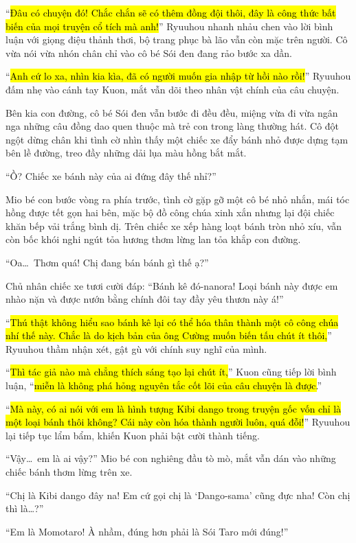 \documentclass[../main.tex]{subfiles}
\begin{document}
``\hl{Đâu có chuyện đó! Chắc chắn sẽ có thêm đồng đội thôi, đây là công thức bất biến của mọi truyện cổ tích mà anh!}'' Ryuuhou nhanh nhảu chen vào lời bình luận với giọng điệu thảnh thơi, bộ trang phục bà lão vẫn còn mặc trên người. Cô vừa nói vừa nhón chân chỉ vào cô bé Sói đen đang rảo bước xa dần.

``\hl{Anh cứ lo xa, nhìn kia kìa, đã có người muốn gia nhập từ hồi nào rồi!}'' Ryuuhou đấm nhẹ vào cánh tay Kuon, mắt vẫn dõi theo nhân vật chính của câu chuyện.

Bên kia con đường, cô bé Sói đen vẫn bước đi đều đều, miệng vừa đi vừa ngân nga những câu đồng dao quen thuộc mà trẻ con trong làng thường hát. Cô đột ngột dừng chân khi tình cờ nhìn thấy một chiếc xe đẩy bánh nhỏ được dựng tạm bên lề đường, treo đầy những dải lụa màu hồng bắt mắt.

``Ồ? Chiếc xe bánh này của ai đứng đây thế nhỉ?''

Mio bé con bước vòng ra phía trước, tình cờ gặp gỡ một cô bé nhỏ nhắn, mái tóc hồng được tết gọn hai bên, mặc bộ đồ công chúa xinh xắn nhưng lại đội chiếc khăn bếp vải trắng bình dị. Trên chiếc xe xếp hàng loạt bánh tròn nhỏ xíu, vẫn còn bốc khói nghi ngút tỏa hương thơm lừng lan tỏa khắp con đường.

``Oa\dots\ Thơm quá! Chị đang bán bánh gì thế ạ?''

Chủ nhân chiếc xe tươi cười đáp: ``Bánh kê đó-nanora! Loại bánh này được em nhào nặn và được nướn bằng chính đôi tay đầy yêu thươn này á!''

``\hl{Thú thật không hiểu sao bánh kê lại có thể hóa thân thành một cô công chúa nhí thế này. Chắc là do kịch bản của ông Cường muốn biến tấu chút ít thôi,}'' Ryuuhou thầm nhận xét, gật gù với chính suy nghĩ của mình.

``\hl{Thì tác giả nào mà chẳng thích sáng tạo lại chút ít,}'' Kuon cũng tiếp lời bình luận, ``\hl{miễn là không phá hỏng nguyên tắc cốt lõi của câu chuyện là được.}''

``\hl{Mà này, có ai nói với em là hình tượng Kibi dango trong truyện gốc vốn chỉ là một loại bánh thôi không? Cái này còn hóa thành người luôn, quá đỗi!}'' Ryuuhou lại tiếp tục lẩm bẩm, khiến Kuon phải bật cười thành tiếng.

``Vậy\dots\ em là ai vậy?'' Mio bé con nghiêng đầu tò mò, mắt vẫn dán vào những chiếc bánh thơm lừng trên xe.

``Chị là Kibi dango đây na! Em cứ gọi chị là `Dango-sama' cũng đực nha! Còn chị thì là\dots?''

``Em là Momotaro! À nhầm, đúng hơn phải là Sói Taro mới đúng!''
\end{document}

